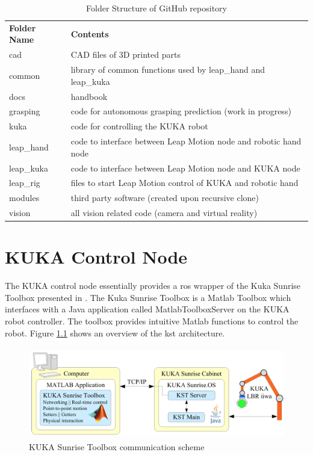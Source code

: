 \documentclass[headsepline,footinclude=false,fontsize=11pt,paper=a4,listof=totoc,bibliography=totoc,BCOR=12mm,DIV=14]{scrbook}
\begin{document}
\begin{table}[h]
\centering
\begin{tabular}{ll}
\textbf{Folder Name} & \textbf{Contents}                                                 \\
cad                  & CAD files of 3D printed parts                                     \\
common               & library of common functions used by leap\_hand and leap\_kuka     \\
docs 				 & handbook \\
grasping             & code for autonomous grasping prediction (work in progress)        \\
kuka                 & code for controlling the KUKA robot                               \\
leap\_hand           & code to interface between Leap Motion node and robotic hand node  \\
leap\_kuka           & code to interface between Leap Motion node and KUKA node          \\
leap\_rig            & files to start Leap Motion control of KUKA and robotic hand       \\
modules              & third party software (created upon recursive clone)                                            \\
vision               & all vision related code (camera and virtual reality)
\end{tabular}
\caption{Folder Structure of GitHub repository}
\end{table}

\chapter{KUKA Control Node}

The KUKA control node essentially provides a \gls{ros} wrapper of the Kuka Sunrise Toolbox presented in \cite{Safeea2019}. The Kuka Sunrise Toolbox is a Matlab Toolbox which interfaces with a Java application called MatlabToolboxServer on the KUKA robot controller. The toolbox provides intuitive Matlab functions to control the robot. Figure \ref{fig:kst} shows an overview of the \gls{kst} architecture. 

\begin{figure}[h]
    \centering
    \includegraphics[height=4cm]{images/kst}
    \caption{KUKA Sunrise Toolbox communication scheme \cite{Safeea2019}}
    \label{fig:kst}
\end{figure}
\end{document}
